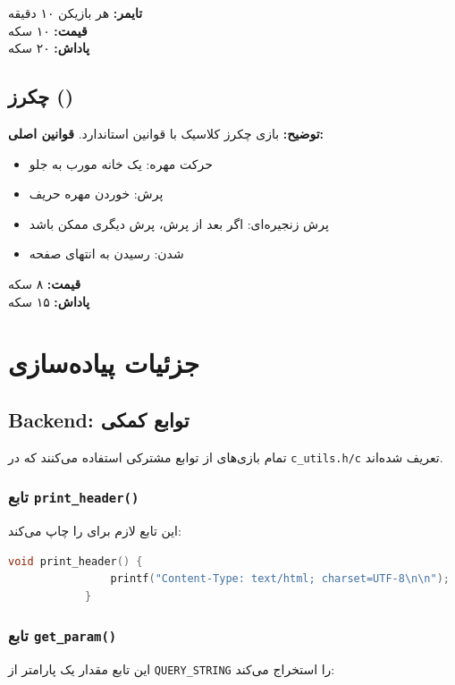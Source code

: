 \documentclass[12pt,a4paper]{article}
\begin{document}
	\textbf{تایمر:} هر بازیکن ۱۰ دقیقه\\
	\textbf{قیمت:} ۱۰ سکه\\
	\textbf{پاداش:} ۲۰ سکه
	
	\subsection{چکرز ()}
	\textbf{توضیح:} بازی چکرز کلاسیک با قوانین استاندارد.
	\textbf{قوانین اصلی:}
	\begin{itemize}
		\item حرکت مهره: یک خانه مورب به جلو
		\item پرش: خوردن مهره حریف
		\item پرش زنجیره‌ای: اگر بعد از پرش، پرش دیگری ممکن باشد
		\item {} شدن: رسیدن به انتهای صفحه
	\end{itemize}
	\textbf{قیمت:} ۸ سکه\\
	\textbf{پاداش:} ۱۵ سکه
	
	\newpage
	\section{جزئیات پیاده‌سازی}
	
	\subsection{Backend: توابع کمکی }
	
	تمام بازی‌های  از توابع مشترکی استفاده می‌کنند که در \texttt{c\_utils.h/c} تعریف شده‌اند.
	
	\subsubsection{تابع \texttt{print\_header()}}
	این تابع  لازم برای  را چاپ می‌کند:
	
	\begin{latin}
		\begin{lstlisting}[language=C, caption=تابع print\_header]
			void print_header() {
				printf("Content-Type: text/html; charset=UTF-8\n\n");
			}
		\end{lstlisting}
	\end{latin}
	
	\subsubsection{تابع \texttt{get\_param()}}
	این تابع مقدار یک پارامتر از \texttt{QUERY\_STRING} را استخراج می‌کند:
	
\end{document}
